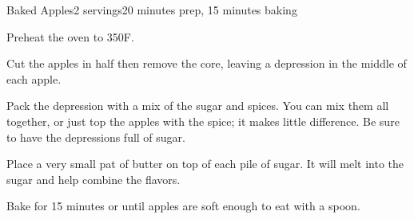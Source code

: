 \documentclass[../Cookbook.tex]{subfiles}
\begin{document}
\begin{recipe}{Baked Apples}{2 servings}{20 minutes prep, 15 minutes baking}

	Preheat the oven to 350\0F.

	Cut the apples in half then remove the core, leaving a depression in the middle of each apple.

	Pack the depression with a mix of the sugar and spices. You can mix them all together, or just top the apples with the spice; it makes little difference. Be sure to have the depressions full of sugar.

	Place a very small pat of butter on top of each pile of sugar. It will melt into the sugar and help combine the flavors.

	Bake for 15 minutes or until apples are soft enough to eat with a spoon.

\end{recipe}
\end{document}
